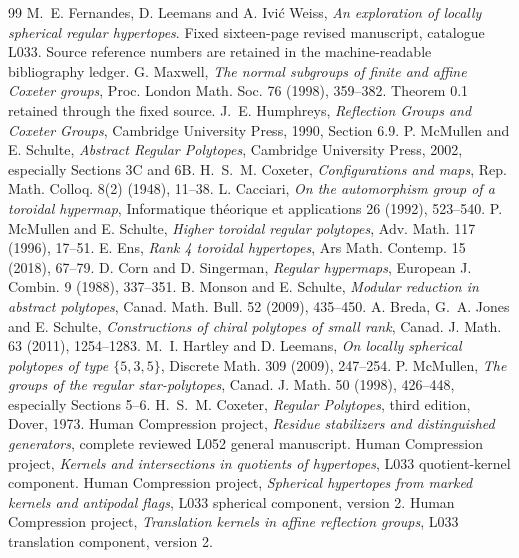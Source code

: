 \documentclass[11pt,a4paper]{article}
\begin{document}
\begin{thebibliography}{99}
 M.~E. Fernandes, D. Leemans and A. Ivi\'c Weiss,
\emph{An exploration of locally spherical regular hypertopes}. Fixed
sixteen-page revised manuscript, catalogue L033. Source reference numbers
are retained in the machine-readable bibliography ledger.
 G. Maxwell, \emph{The normal subgroups of finite and affine
Coxeter groups}, Proc. London Math. Soc. 76 (1998), 359--382.
Theorem 0.1 retained through the fixed source.
 J.~E. Humphreys, \emph{Reflection Groups and Coxeter
Groups}, Cambridge University Press, 1990, Section 6.9.
 P. McMullen and E. Schulte, \emph{Abstract Regular
Polytopes}, Cambridge University Press, 2002, especially Sections 3C and 6B.
 H.~S.~M. Coxeter, \emph{Configurations and maps},
Rep. Math. Colloq. 8(2) (1948), 11--38.
 L. Cacciari, \emph{On the automorphism group of a toroidal
hypermap}, Informatique th\'eorique et applications 26 (1992), 523--540.
 P. McMullen and E. Schulte, \emph{Higher toroidal regular
polytopes}, Adv. Math. 117 (1996), 17--51.
 E. Ens, \emph{Rank 4 toroidal hypertopes}, Ars Math.
Contemp. 15 (2018), 67--79.
 D. Corn and D. Singerman, \emph{Regular hypermaps},
European J. Combin. 9 (1988), 337--351.
 B. Monson and E. Schulte, \emph{Modular reduction in abstract
polytopes}, Canad. Math. Bull. 52 (2009), 435--450.
 A. Breda, G.~A. Jones and E. Schulte, \emph{Constructions
of chiral polytopes of small rank}, Canad. J. Math. 63 (2011), 1254--1283.
 M.~I. Hartley and D. Leemans, \emph{On locally spherical
polytopes of type $\{5,3,5\}$}, Discrete Math. 309 (2009), 247--254.
 P. McMullen, \emph{The groups of the regular star-polytopes},
Canad. J. Math. 50 (1998), 426--448, especially Sections 5--6.
 H.~S.~M. Coxeter, \emph{Regular Polytopes},
third edition, Dover, 1973.
 Human Compression project, \emph{Residue stabilizers and
distinguished generators}, complete reviewed L052 general manuscript.
 Human Compression project, \emph{Kernels and intersections
in quotients of hypertopes}, L033 quotient-kernel component.
 Human Compression project, \emph{Spherical hypertopes
from marked kernels and antipodal flags}, L033 spherical component, version 2.
 Human Compression project, \emph{Translation kernels
in affine reflection groups}, L033 translation component, version 2.

\end{thebibliography}
\end{document}
